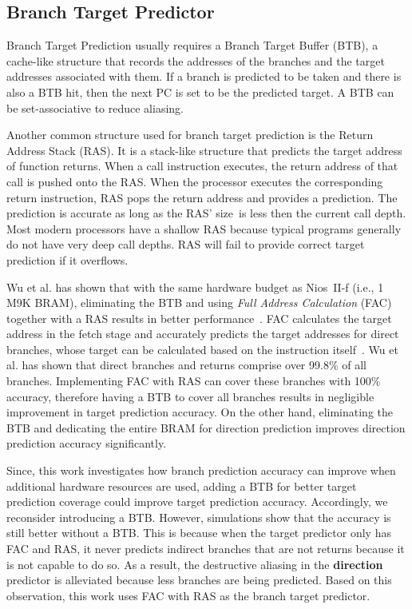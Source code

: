 \documentclass[conference]{IEEEtran}
\begin{document}
\subsection{Branch Target Predictor}
\label{sec:scheme:target}
Branch Target Prediction usually requires a Branch Target Buffer (BTB), a cache-like structure that records the addresses of the branches and the target addresses associated with them. If a branch is predicted to be taken and there is also a BTB hit, then the next PC is set to be the predicted target. A BTB can be set-associative to reduce aliasing.

Another common structure used for branch target prediction is the Return Address Stack (RAS). It is a stack-like structure that predicts the target address of function returns. When a call instruction executes, the return address of that call is pushed onto the RAS. When the processor executes the corresponding return instruction, RAS pops the return address and provides a prediction. The prediction is accurate as long as  the RAS' size\ is less then the current call depth. Most modern processors have a shallow RAS because typical programs generally do not have very deep call depths. RAS will fail to provide correct target prediction if it overflows.

Wu et al. has shown that with  the same hardware budget as Nios~II-f (i.e., 1 M9K BRAM), eliminating the BTB and using \textit{Full Address Calculation} (FAC) together with a RAS results in better performance~\cite{grselect}. FAC  calculates the target address in the fetch stage and accurately predicts the target addresses for direct branches, whose target can be calculated based on the instruction itself~\cite{niosii}. Wu et al. has shown that direct branches and returns comprise over 99.8\% of all branches. Implementing FAC with RAS can cover these branches with 100\% accuracy, therefore having a BTB to cover all branches results in negligible improvement in target prediction accuracy. On the other hand, eliminating the BTB and dedicating the entire BRAM for direction prediction improves direction prediction accuracy significantly.

Since, this work investigates how branch prediction accuracy can improve when additional hardware resources are used,  adding a BTB for better target prediction coverage could improve target prediction accuracy. Accordingly, we reconsider introducing a BTB. However, simulations show that the accuracy is still better without a BTB. This is because when the target predictor only has FAC and RAS, it never predicts indirect branches that are not returns because it is not capable to do so. As a result, the destructive aliasing in the \textbf{direction} predictor is alleviated because less branches are being predicted. Based on this observation, this work uses FAC with RAS as the branch target predictor.
\end{document}
